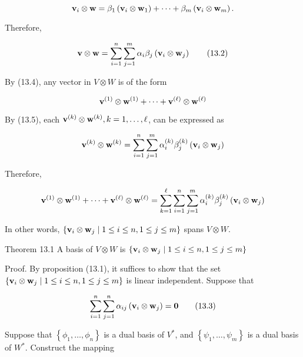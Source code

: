 \documentclass[11pt]{article}
\begin{document}
\[
{\bf v}_{i} \otimes  \mathbf{w} = \beta_1\left( {{\bf v}_{i} \otimes  {\bf w}_1}\right)  + \cdots  + \beta_{m}\left( {{\bf v}_{i} \otimes  {\bf w}_{m}}\right) .
\]

Therefore,

\[
\mathbf{v} \otimes  \mathbf{w} = \mathop{\sum }\limits_{{i = 1}}^n\mathop{\sum }\limits_{{j = 1}}^{m}\alpha_{i}\beta_{j}\left( {{\bf v}_{i} \otimes  {\bf w}_{j}}\right)  \tag{13.2}
\]

By (13.4), any vector in \(V \otimes  W\) is of the form

\[
{\bf v}^{\left( 1\right) } \otimes  {\bf w}^{\left( 1\right) } + \cdots  + {\bf v}^{\left( \ell \right) } \otimes  {\bf w}^{\left( \ell \right) }
\]

By (13.5), each \({\bf v}^{\left( k\right) } \otimes  {\bf w}^{\left( k\right) },k = 1,\ldots ,\ell\), can be expressed as

\[
{\bf v}^{\left( k\right) } \otimes  {\bf w}^{\left( k\right) } = \mathop{\sum }\limits_{{i = 1}}^n\mathop{\sum }\limits_{{j = 1}}^{m}\alpha_{i}^{\left( k\right) }\beta_{j}^{\left( k\right) }\left( {{\bf v}_{i} \otimes  {\bf w}_{j}}\right)
\]

Therefore,

\[
{\bf v}^{\left( 1\right) } \otimes  {\bf w}^{\left( 1\right) } + \cdots  + {\bf v}^{\left( \ell \right) } \otimes  {\bf w}^{\left( \ell \right) } = \mathop{\sum }\limits_{{k = 1}}^{\ell }\mathop{\sum }\limits_{{i = 1}}^n\mathop{\sum }\limits_{{j = 1}}^{m}\alpha_{i}^{\left( k\right) }\beta_{j}^{\left( k\right) }\left( {{\bf v}_{i} \otimes  {\bf w}_{j}}\right)
\]

In other words, \(\left\{  {{\bf v}_{i} \otimes  {\bf w}_{j} \mid  1 \leq  i \leq  n,1 \leq  j \leq  m}\right\}\) spans \(V \otimes  W\).

Theorem 13.1 A basis of \(V \otimes  W\) is \(\left\{  {{\bf v}_{i} \otimes  {\bf w}_{j} \mid  1 \leq  i \leq  n,1 \leq  j \leq  m}\right\}\)

Proof. By proposition (13.1), it suffices to show that the set \(\left\{  {{\bf v}_{i} \otimes  {\bf w}_{j} \mid  1 \leq  i \leq  n,1 \leq  j \leq  m}\right\}\) is linear independent. Suppose that

\[
\mathop{\sum }\limits_{{i = 1}}^n\mathop{\sum }\limits_{{j = 1}}^n\alpha_{ij}\left( {{\bf v}_{i} \otimes  {\bf w}_{j}}\right)  = \mathbf{0} \tag{13.3}
\]

Suppose that \(\left\{  {{\phi }_1,\ldots ,{\phi }_n}\right\}\) is a dual basis of \({V}^{ * }\), and \(\left\{  {{\psi }_1,\ldots ,{\psi }_{m}}\right\}\) is a dual basis of \({W}^{ * }\). Construct the mapping
\end{document}
